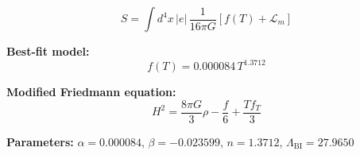 
\begin{equation}
  S = \int d^4x \, |e| \, \frac{1}{16\pi G} \left[ f(T) + \mathcal{L}_m \right]
\end{equation}

\textbf{Best-fit model:}
\begin{equation}
  f(T) = 0.000084 \, T^{1.3712}
\end{equation}

\textbf{Modified Friedmann equation:}
\begin{equation}
  H^2 = \frac{8\pi G}{3} \rho - \frac{f}{6} + \frac{T f_T}{3}
\end{equation}

\textbf{Parameters:}
$\alpha = 0.000084$, \quad
$\beta = -0.023599$, \quad
$n = 1.3712$, \quad
$\Lambda_{\text{BI}} = 27.9650$